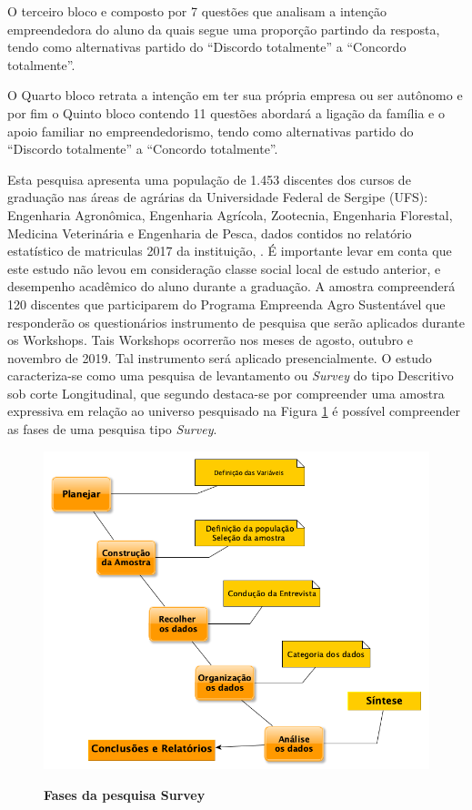 O terceiro bloco e composto por 7 questões que analisam a intenção empreendedora do aluno da quais segue uma proporção partindo da resposta, tendo como alternativas partido do “Discordo totalmente” a “Concordo totalmente”.

O Quarto bloco retrata a intenção em ter sua própria empresa ou ser autônomo e por fim o Quinto bloco contendo 11 questões abordará a ligação da família e o apoio familiar no empreendedorismo, tendo como alternativas partido do “Discordo totalmente” a “Concordo totalmente”. 

Esta pesquisa apresenta uma população de 1.453 discentes dos cursos de graduação nas áreas de agrárias da Universidade Federal de Sergipe (UFS): Engenharia Agronômica, Engenharia Agrícola, Zootecnia, Engenharia Florestal, Medicina Veterinária e Engenharia de Pesca, dados contidos no relatório estatístico de matriculas 2017 da instituição, \cite{campelo_ufs_2018}. É importante levar em conta que este estudo não levou em consideração classe social local de estudo anterior, e desempenho acadêmico do aluno durante a graduação. 
A amostra compreenderá 120 discentes que participarem do Programa Empreenda Agro Sustentável que responderão os questionários instrumento de pesquisa que serão aplicados durante os Workshops. Tais Workshops ocorrerão nos meses de agosto, outubro e novembro de 2019. Tal instrumento será aplicado presencialmente. O estudo caracteriza-se como uma pesquisa de levantamento ou \textit{Survey} do tipo Descritivo sob corte Longitudinal, que segundo  destaca-se por compreender uma amostra expressiva em relação ao universo pesquisado na Figura \ref{figura_1} é possível compreender as fases de uma pesquisa tipo \textit{Survey}.

\begin{figure}[!htb]
\centering
\caption{\textbf{Fases da pesquisa Survey}}
\includegraphics[scale=0.5]{Imagens/diagrama_survey.png}
\label{figura_1}
\end{figure}


